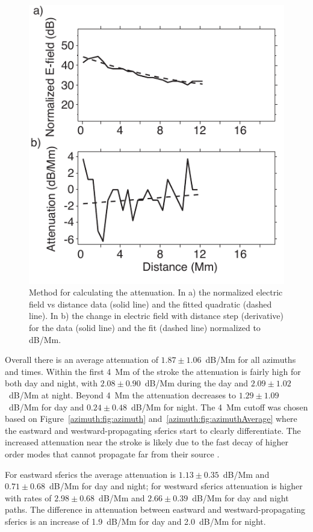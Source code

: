 \begin{figure}[h!t]
    \centering
    \includegraphics[scale=1]{Azimuth/Figures/attenuationCalculation.pdf} 
    \caption{Method for calculating the attenuation.
    	In a) the normalized electric field vs distance data (solid line) and the fitted quadratic (dashed line).
	In b) the change in electric field with distance step (derivative) for the data (solid line) and the fit (dashed line) normalized to dB/Mm.}
    \label{azimuth:fig:attenuationCalculation}
 \end{figure}

Overall there is an average attenuation of $1.87 \pm 1.06$~dB/Mm for all azimuths and times.
Within the first 4~Mm of the stroke the attenuation is fairly high for both day and night, with $2.08 \pm 0.90$~dB/Mm during the day and $2.09 \pm 1.02$~dB/Mm at night.
Beyond 4~Mm the attenuation decreases to $1.29 \pm 1.09$~dB/Mm for day and $0.24 \pm 0.48$~dB/Mm for night.
The 4~Mm cutoff was chosen based on Figure~\ref{azimuth:fig:azimuth} and~\ref{azimuth:fig:azimuthAverage} where the eastward and westward-propagating sferics start to clearly differentiate.
The increased attenuation near the stroke is likely due to the fast decay of higher order modes that cannot propagate far from their source \citep{Wait1970}.

For eastward sferics the average attenuation is $1.13 \pm 0.35$~dB/Mm and $0.71 \pm 0.68$~dB/Mm for day and night; for westward sferics attenuation is higher with rates of $2.98 \pm 0.68$~dB/Mm and $2.66 \pm 0.39$~dB/Mm for day and night paths.
The difference in attenuation between eastward and westward-propagating sferics is an increase of  1.9~dB/Mm for day and 2.0~dB/Mm for night.
  
